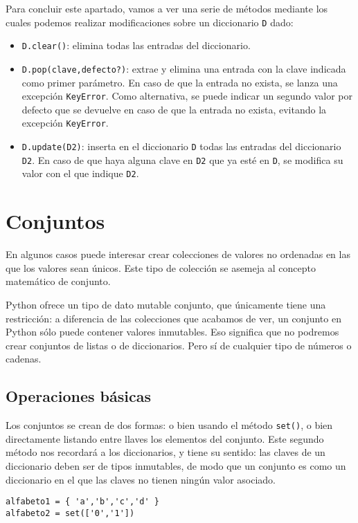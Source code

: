 Para concluir este apartado, vamos a ver una serie de métodos mediante los cuales podemos realizar modificaciones sobre un diccionario \texttt{D} dado:
\begin{itemize}
	\item \texttt{D.clear()}: elimina todas las entradas del diccionario.
	\item \texttt{D.pop(clave,defecto?)}: extrae y elimina una entrada con la clave indicada como primer parámetro. En caso de que la entrada no exista, se lanza una excepción \texttt{KeyError}. Como alternativa, se puede indicar un segundo valor por defecto que se devuelve en caso de que la entrada no exista, evitando la excepción \texttt{KeyError}. 
	\item \texttt{D.update(D2)}: inserta en el diccionario \texttt{D} todas las entradas del diccionario \texttt{D2}. En caso de que haya alguna clave en \texttt{D2} que ya esté en \texttt{D}, se modifica su valor con el que indique \texttt{D2}.
\end{itemize}

\section{Conjuntos}\label{sec:conjuntos}

En algunos casos puede interesar crear colecciones de valores no ordenadas en las que los valores sean únicos. Este tipo de colección se asemeja al concepto matemático de conjunto. 

Python ofrece un tipo de dato mutable conjunto, que únicamente tiene una restricción: a diferencia de las colecciones que acabamos de ver, un conjunto en Python sólo puede contener valores inmutables. Eso significa que no podremos crear conjuntos de listas o de diccionarios. Pero sí de cualquier tipo de números o cadenas.

\subsection{Operaciones básicas}

Los conjuntos se crean de dos formas: o bien usando el método \texttt{set()}, o bien directamente listando entre llaves los elementos del conjunto. Este segundo método nos recordará a los diccionarios, y tiene su sentido: las claves de un diccionario deben ser de tipos inmutables, de modo que un conjunto es como un diccionario en el que las claves no tienen ningún valor asociado.

\begin{lstlisting}
alfabeto1 = { 'a','b','c','d' }
alfabeto2 = set(['0','1'])
\end{lstlisting}

